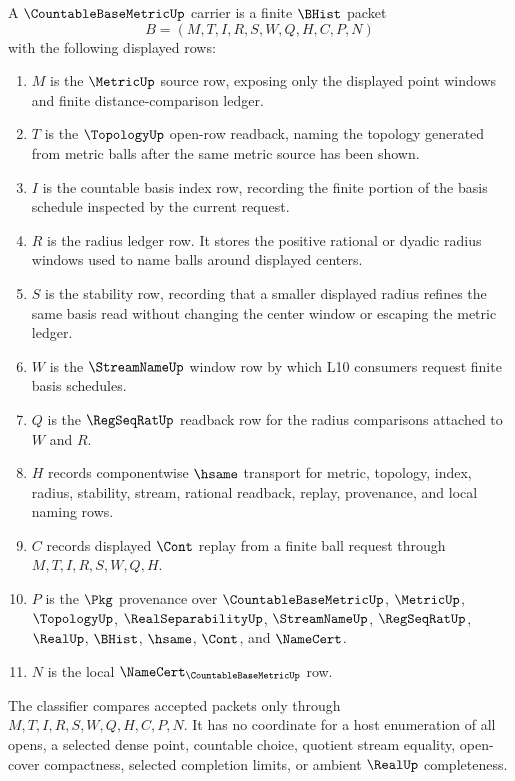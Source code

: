 \begin{definition}
\label{def:countable-base-metric-carrier}
A $\CountableBaseMetricUp$ carrier is a finite $\BHist$ packet
$$
B=(M,T,I,R,S,W,Q,H,C,P,N)
$$
with the following displayed rows:
\begin{enumerate}
\item $M$ is the $\MetricUp$ source row, exposing only the displayed point windows and finite distance-comparison ledger.
\item $T$ is the $\TopologyUp$ open-row readback, naming the topology generated from metric balls after the same metric source has been shown.
\item $I$ is the countable basis index row, recording the finite portion of the basis schedule inspected by the current request.
\item $R$ is the radius ledger row. It stores the positive rational or dyadic radius windows used to name balls around displayed centers.
\item $S$ is the stability row, recording that a smaller displayed radius refines the same basis read without changing the center window or escaping the metric ledger.
\item $W$ is the $\StreamNameUp$ window row by which L10 consumers request finite basis schedules.
\item $Q$ is the $\RegSeqRatUp$ readback row for the radius comparisons attached to $W$ and $R$.
\item $H$ records componentwise $\hsame$ transport for metric, topology, index, radius, stability, stream, rational readback, replay, provenance, and local naming rows.
\item $C$ records displayed $\Cont$ replay from a finite ball request through $M,T,I,R,S,W,Q,H$.
\item $P$ is the $\Pkg$ provenance over $\CountableBaseMetricUp$, $\MetricUp$, $\TopologyUp$, $\RealSeparabilityUp$, $\StreamNameUp$, $\RegSeqRatUp$, $\RealUp$, $\BHist$, $\hsame$, $\Cont$, and $\NameCert$.
\item $N$ is the local $\NameCert_{\CountableBaseMetricUp}$ row.
\end{enumerate}
The classifier compares accepted packets only through $M,T,I,R,S,W,Q,H,C,P,N$. It has no coordinate for a host enumeration of all opens, a selected dense point, countable choice, quotient stream equality, open-cover compactness, selected completion limits, or ambient $\RealUp$ completeness.
\end{definition}

